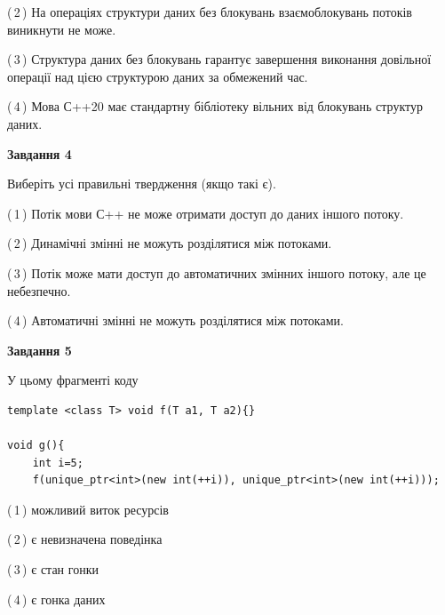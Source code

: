 \documentclass[12pt, ukrainian]{article}
\begin{document}
\begin {large}
{(\,2\,) На операціях структури даних без блокувань взаємоблокувань потоків виникнути не може.%

(\,3\,) Структура даних без блокувань гарантує завершення виконання довільної операції над цією структурою даних за обмежений час.%

(\,4\,) Мова С++20 має стандартну бібліотеку вільних від блокувань структур даних.%



\begin{center}
\textbf{Завдання 4}
\end{center}
Виберіть усі правильні твердження (якщо такі є).\par
\vspace{2mm}

(\,1\,) Потік мови С++ не може отримати доступ до даних іншого потоку.%

(\,2\,) Динамічні змінні не можуть розділятися між потоками.%

(\,3\,) Потік може мати доступ до автоматичних змінних іншого потоку, але це небезпечно.%

(\,4\,) Автоматичні змінні не можуть розділятися між потоками.%



\begin{center}
\textbf{Завдання 5}
\end{center}
У цьому фрагменті коду
\begin{verbatim}
template <class T> void f(T a1, T a2){}

void g(){
    int i=5;
    f(unique_ptr<int>(new int(++i)), unique_ptr<int>(new int(++i)));
\end{verbatim}

(\,1\,) можливий виток ресурсів%

(\,2\,) є невизначена поведінка%

(\,3\,) є стан гонки%

(\,4\,) є гонка даних%


}
\end {large}
\end{document}
